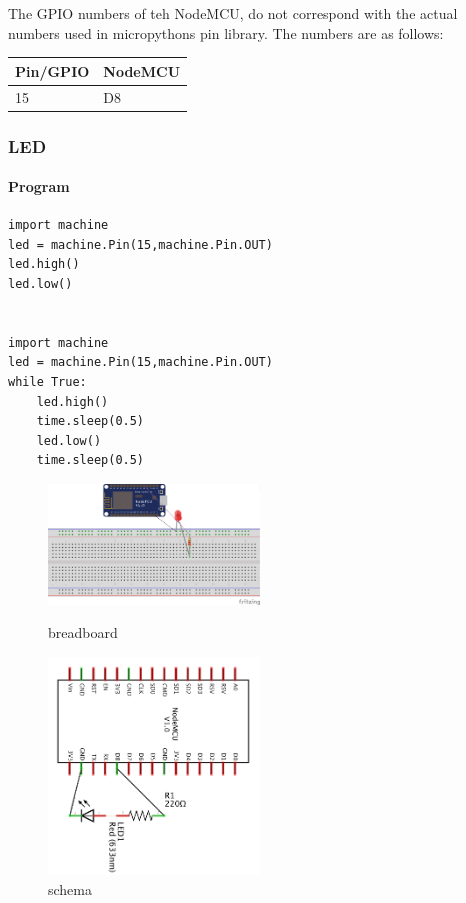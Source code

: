 The GPIO numbers of teh NodeMCU, do not correspond with the actual
numbers used in micropythons pin library. The numbers are as follows:

\begin{longtable}[]{@{}ll@{}}
\toprule
Pin/GPIO & NodeMCU\tabularnewline
\midrule
\endhead
15 & D8\tabularnewline
\bottomrule
\end{longtable}

\subsubsection{LED}\label{led}

\paragraph{Program}\label{program}

\begin{verbatim}
import machine
led = machine.Pin(15,machine.Pin.OUT)
led.high()
led.low()


import machine
led = machine.Pin(15,machine.Pin.OUT)
while True:
    led.high()
    time.sleep(0.5)
    led.low()
    time.sleep(0.5)
\end{verbatim}

\begin{figure}[htb]
\centering
\includegraphics[width=0.5\textwidth]{images/led-esp8266_bb.png}
\caption{breadboard}

\includegraphics[width=0.5\textwidth]{images/led-esp8266_schem.png}
\caption{schema}
\end{figure}

